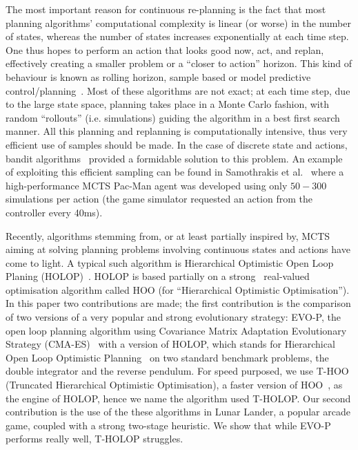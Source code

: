 \documentclass[conference]{IEEEtran}
\begin{document}
The most important reason for continuous re-planning is the fact that most planning algorithms' computational complexity is linear (or worse) in the number of states, whereas the number of states increases exponentially at each time step. One thus hopes to perform an action that looks good now, act, and replan, effectively creating a smaller problem or a ``closer to action'' horizon. This kind of behaviour is known as rolling horizon, sample based or model predictive control/planning~\cite{chang2007simulation}. Most of these algorithms are not exact; at each time step, due to the large state space, planning takes place in a Monte Carlo fashion, with random ``rollouts'' (i.e. simulations) guiding the algorithm in a best first search manner. All this planning and replanning is computationally intensive, thus very efficient use of samples should be made.  In the case of discrete state and actions, bandit algorithms~\cite{auer2002finite} provided a formidable solution to this problem.
An example of exploiting this efficient sampling can be found in Samothrakis et al.~\cite{samothrakis2011fast} where a high-performance MCTS Pac-Man agent
was developed using only $50 - 300$ simulations per action (the game simulator requested an action
from the controller every 40ms).


Recently, algorithms stemming from, or at least partially inspired by, MCTS aiming at solving planning problems involving continuous states and actions have come to light. A typical such algorithm is Hierarchical Optimistic Open Loop Planing (HOLOP)~\cite{weinstein2012bandit}. HOLOP is based partially on a strong~\cite{hoo2011} real-valued optimisation algorithm called HOO (for ``Hierarchical Optimistic Optimisation''). In this paper two contributions are made; the first contribution is the comparison of two versions of a very popular and strong evolutionary strategy: EVO-P, the open loop planning algorithm using Covariance Matrix Adaptation Evolutionary Strategy (CMA-ES)~\cite{hansen2003reducing} with a version of HOLOP, which stands for Hierarchical Open Loop Optimistic Planning~\cite{hoo2011} on two standard benchmark problems, the double integrator and the reverse pendulum.  For speed purposed, we use T-HOO (Truncated Hierarchical Optimistic Optimisation), a faster version of HOO~\cite{hoo2011}, as the engine of HOLOP, hence we name the algorithm used T-HOLOP.  Our second contribution is the use of the these algorithms in Lunar Lander, a popular arcade game, coupled with a strong two-stage heuristic. We show that while EVO-P performs really well, T-HOLOP struggles. 
\end{document}
